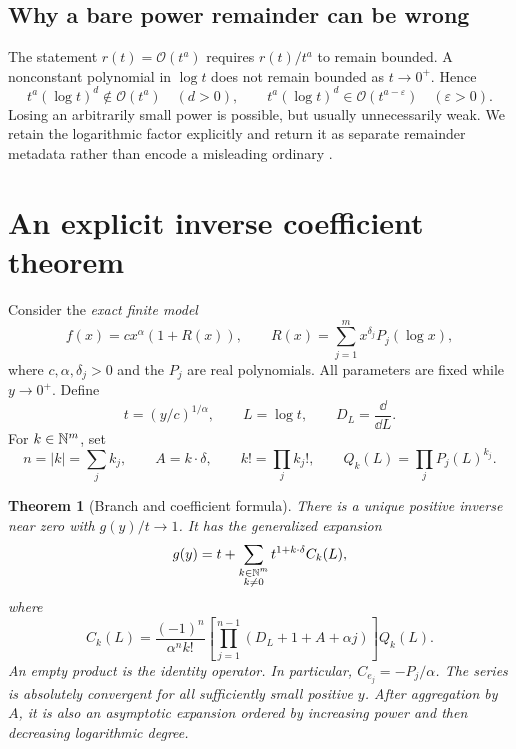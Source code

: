 \documentclass[11pt,a4paper]{article}
\numberwithin{equation}{section}
\newtheorem{theorem}{Theorem}[section]
\theoremstyle{definition}\newtheorem{definition}[theorem]{Definition}
\theoremstyle{remark}\newtheorem{remark}[theorem]{Remark}
\newcommand{\OO}{\mathcal O}\newcommand{\Id}{\mathrm{id}}
\newcommand{\code}[1]{\texttt{\detokenize{#1}}}
\begin{document}
\subsection{Why a bare power remainder can be wrong}
The statement $r(t)=\OO(t^a)$ requires $r(t)/t^a$ to remain bounded. A nonconstant polynomial in $\log t$ does not remain bounded as $t\to0^+$. Hence
\[
t^a(\log t)^d\notin\OO(t^a)\quad(d>0),
\qquad
 t^a(\log t)^d\in\OO(t^{a-\varepsilon})\quad(\varepsilon>0).
\]
Losing an arbitrarily small power is possible, but usually unnecessarily weak. We retain the logarithmic factor explicitly and return it as separate remainder metadata rather than encode a misleading ordinary \code{O[y]^n}.

\section{An explicit inverse coefficient theorem}
\label{sec:main}
Consider the \emph{exact finite model}
\begin{equation}\label{eq:model}
f(x)=cx^\alpha(1+R(x)),\qquad
R(x)=\sum_{j=1}^m x^{\delta_j}P_j(\log x),
\end{equation}
where $c,\alpha,\delta_j>0$ and the $P_j$ are real polynomials. All parameters are fixed while $y\to0^+$. Define
\begin{equation}\label{eq:normalization}
t=(y/c)^{1/\alpha},\qquad L=\log t,\qquad D_L=\frac\dd{\dd L}.
\end{equation}
For $k\in\mathbb N^m$, set
\[
n=|k|=\sum_jk_j,\qquad A=k\cdot\delta,\qquad
k!=\prod_jk_j!,\qquad Q_k(L)=\prod_jP_j(L)^{k_j}.
\]

\begin{theorem}[Branch and coefficient formula]\label{thm:coefficient}
There is a unique positive inverse near zero with $g(y)/t\to1$. It has the generalized expansion
\begin{equation}\label{eq:fullinverse}
g(y)=t+\sum_{\substack{k\in\mathbb N^m\\k\ne0}}t^{1+k\cdot\delta}C_k(L),
\end{equation}
where
\begin{equation}\boxed{\displaystyle
C_k(L)=\frac{(-1)^n}{\alpha^n k!}
\left[\prod_{j=1}^{n-1}\left(D_L+1+A+\alpha j\right)\right]Q_k(L).}
\label{eq:coefficient}
\end{equation}
An empty product is the identity operator. In particular, $C_{e_j}=-P_j/\alpha$. The series is absolutely convergent for all sufficiently small positive $y$. After aggregation by $A$, it is also an asymptotic expansion ordered by increasing power and then decreasing logarithmic degree.
\end{theorem}
\end{document}
